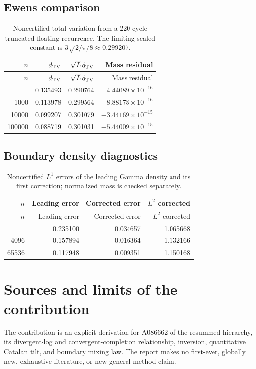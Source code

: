 \documentclass[11pt,letterpaper]{article}
\numberwithin{equation}{section}
\theoremstyle{remark}\newtheorem{remark}[theorem]{Remark}
\begin{document}
\subsection{Ewens comparison}
\begin{longtable}{rrrr}
\caption{Noncertified total variation from a 220-cycle truncated floating recurrence. The limiting scaled constant is $3\sqrt{2/\pi}/8\approx0.299207$.}\label{stc:s1:tab:tv}\\
\toprule $n$ & $d_{\rm TV}$ & $\sqrt L\,d_{\rm TV}$ & Mass residual \\ \midrule
\endfirsthead
\toprule $n$ & $d_{\rm TV}$ & $\sqrt L\,d_{\rm TV}$ & Mass residual \\ \midrule
\endhead
\bottomrule\endfoot
100 & 0.135493 & 0.290764 & $4.44089\times10^{-16}$ \\
1000 & 0.113978 & 0.299564 & $8.88178\times10^{-16}$ \\
10000 & 0.099207 & 0.301079 & $-3.44169\times10^{-15}$ \\
100000 & 0.088719 & 0.301031 & $-5.44009\times10^{-15}$ \\
\end{longtable}
\subsection{Boundary density diagnostics}
\begin{longtable}{rrrr}
\caption{Noncertified $L^1$ errors of the leading Gamma density and its first correction; normalized mass is checked separately.}\label{stc:s1:tab:boundary}\\
\toprule $n$ & Leading error & Corrected error & $L^2$ corrected \\ \midrule
\endfirsthead
\toprule $n$ & Leading error & Corrected error & $L^2$ corrected \\ \midrule
\endhead
\bottomrule\endfoot
256 & 0.235100 & 0.034657 & 1.065668 \\
4096 & 0.157894 & 0.016364 & 1.132166 \\
65536 & 0.117948 & 0.009351 & 1.150168 \\
\end{longtable}

\section{Sources and limits of the contribution}\label{stc:s1:sec:sources}
The contribution is an explicit derivation for A086662 of the resummed hierarchy, its divergent-log and convergent-completion relationship, inversion, quantitative Catalan tilt, and boundary mixing law. The report makes no first-ever, globally new, exhaustive-literature, or new-general-method claim.
\end{document}
